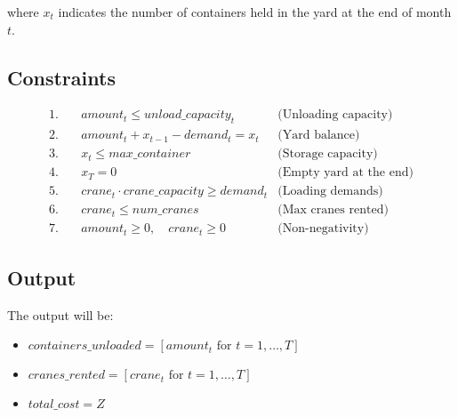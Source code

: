 \documentclass{article}
\begin{document}
where \(x_t\) indicates the number of containers held in the yard at the end of month \(t\).

\subsection*{Constraints}
\begin{align*}
1. \quad & amount_t \leq unload\_capacity_t & \text{(Unloading capacity)} \\
2. \quad & amount_t + x_{t-1} - demand_t = x_t & \text{(Yard balance)} \\
3. \quad & x_t \leq max\_container & \text{(Storage capacity)} \\
4. \quad & x_T = 0 & \text{(Empty yard at the end)} \\
5. \quad & crane_t \cdot crane\_capacity \geq demand_t & \text{(Loading demands)} \\
6. \quad & crane_t \leq num\_cranes & \text{(Max cranes rented)} \\
7. \quad & amount_t \geq 0, \quad crane_t \geq 0 & \text{(Non-negativity)}
\end{align*}

\subsection*{Output}
The output will be:
\begin{itemize}
    \item $containers\_unloaded = [amount_t \text{ for } t = 1, \ldots, T]$
    \item $cranes\_rented = [crane_t \text{ for } t = 1, \ldots, T]$
    \item $total\_cost = Z$
\end{itemize}
\end{document}
